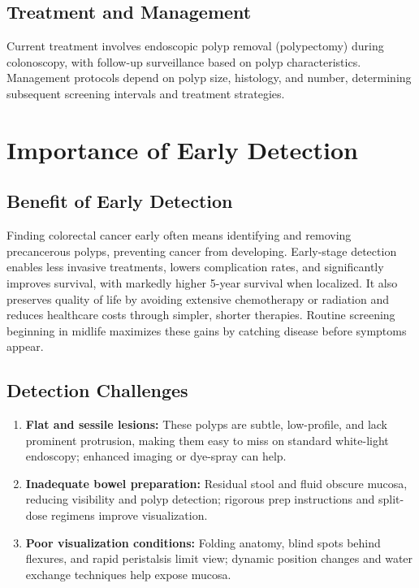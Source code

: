 \documentclass[a4paper,12pt]{report}
\begin{document}
    \subsection{Treatment and Management}
Current treatment involves endoscopic polyp removal (polypectomy) during colonoscopy, with follow-up surveillance based on polyp characteristics. Management protocols depend on polyp size, histology, and number, determining subsequent screening intervals and treatment strategies.
 \section{Importance of Early Detection}
    \subsection{Benefit of Early Detection}
Finding colorectal cancer early often means identifying and removing precancerous polyps, preventing cancer from developing. Early-stage detection enables less invasive treatments, lowers complication rates, and significantly improves survival, with markedly higher 5-year survival when localized. It also preserves quality of life by avoiding extensive chemotherapy or radiation and reduces healthcare costs through simpler, shorter therapies. Routine screening beginning in midlife maximizes these gains by catching disease before symptoms appear.
    \subsection{Detection Challenges}
\begin{enumerate}
    \item\textbf{Flat and sessile lesions:} These polyps are subtle, low-profile, and lack prominent protrusion, making them easy to miss on standard white-light endoscopy; enhanced imaging or dye-spray can help.
    \item\textbf{Inadequate bowel preparation:} Residual stool and fluid obscure mucosa, reducing visibility and polyp detection; rigorous prep instructions and split-dose regimens improve visualization.
    \item\textbf{Poor visualization conditions:} Folding anatomy, blind spots behind flexures, and rapid peristalsis limit view; dynamic position changes and water exchange techniques help expose mucosa.

 \end{enumerate}
\end{document}
